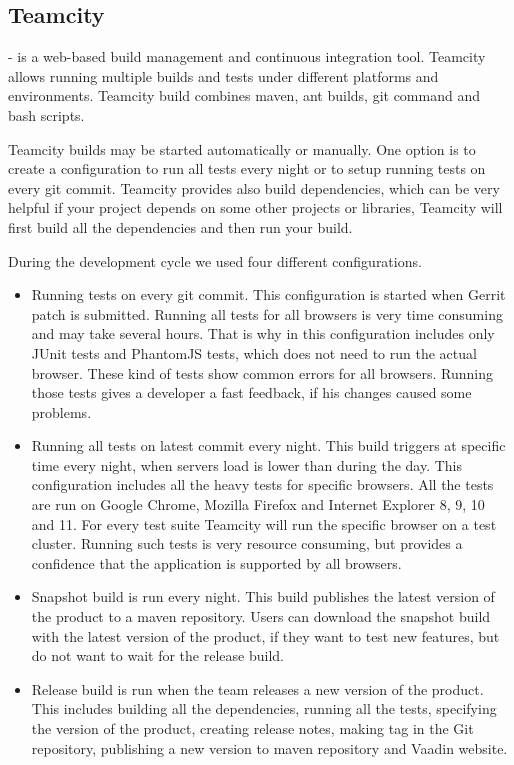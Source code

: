   \subsection{Teamcity} - is a web-based build management and continuous integration
  tool. Teamcity allows running multiple builds and tests under different platforms and environments.
  Teamcity build combines maven, ant builds, git command and bash scripts.
  
  Teamcity builds may be started automatically or manually. One option is to create a configuration to run all
  tests every night or to setup running tests on every git commit. Teamcity
  provides also build dependencies, which can be very helpful if your project
  depends on some other projects or libraries, Teamcity will first build all the dependencies and then run your build.
  
  During the development cycle we used four different configurations.
  \begin{itemize}
  \item Running tests on every git commit. This configuration is started when Gerrit patch is submitted.
   Running all tests for all browsers is very time consuming and may take several hours. 
   That is why in this configuration includes only JUnit tests and PhantomJS
   tests, which does not need to run the actual browser. These kind of tests show common errors for all browsers.
   Running those tests gives a developer a fast feedback, if his changes caused some problems.
   \item Running all tests on latest commit every night. This build triggers at
    specific time every night, when servers load is lower than during the day.
    This configuration includes all the heavy tests for specific browsers. All
    the tests are run on Google Chrome, Mozilla Firefox and Internet Explorer 8, 9, 10 and 11. 
    For every test suite Teamcity will run the specific browser on a test
    cluster. Running such tests is very resource consuming, but provides a
    confidence that the application is supported by all browsers.
    \item Snapshot build is run every night. This build publishes the latest
    version of the product to a maven repository.  Users can download
    the snapshot build with the latest version of the product, if they want to
    test new features, but do not want to wait for the release build.
    \item Release build is run when the team releases a new version of the
    product. This includes building all the dependencies, running all the tests,
    specifying the version of the product, creating release notes, making tag in
    the Git repository, publishing a new version to maven repository and Vaadin
    website.
   \end{itemize}

